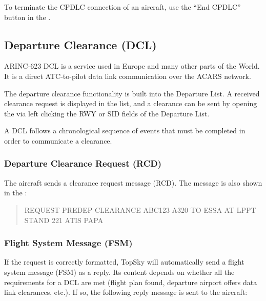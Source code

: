\documentclass[a4paper,oneside,11pt]{memoir}
\begin{document}
\bigskip

To terminate the CPDLC connection of an aircraft, use the “End CPDLC” button in the .


\subsection{Departure Clearance (DCL)}

ARINC-623 DCL is a service used in Europe and many other parts of the World. It is a direct ATC-to-pilot data link communication over the ACARS network.

\bigskip

The departure clearance functionality is built into the Departure List. A received clearance request is displayed in the list, and a clearance can be sent by opening the  via left clicking the RWY or SID fields of the Departure List.

\bigskip

A DCL follows a chronological sequence of events that must be completed in order to communicate a clearance.

\subsubsection{Departure Clearance Request (RCD)}

The aircraft sends a clearance request message (RCD). The message is also shown in the :

\begin{quote}
  REQUEST PREDEP CLEARANCE ABC123 A320 TO ESSA AT LPPT STAND 221 ATIS PAPA
\end{quote}

\subsubsection{Flight System Message (FSM)}

If the request is correctly formatted, TopSky will automatically send a flight system message (FSM) as a reply. Its content depends on whether all the requirements for a DCL are met (flight plan found, departure airport offers data link clearances, etc.). If so, the following reply message is sent to the aircraft:
\end{document}
